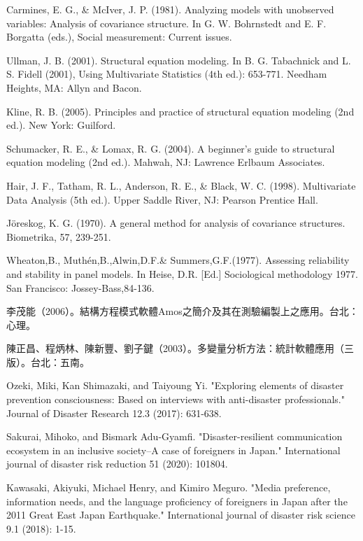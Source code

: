 \documentclass[letterpaper,12pt,titlepage,oneside,final,a4j,dvipdfmx]{book}
\begin{document}
\begin{thebibliography}{60}
 Carmines, E. G., \& McIver, J. P. (1981). Analyzing models with unobserved variables: Analysis of covariance structure. In G. W. Bohrnstedt and E. F. Borgatta (eds.), Social measurement: Current issues.

 Ullman, J. B. (2001). Structural equation modeling. In B. G. Tabachnick and L. S. Fidell (2001), Using Multivariate Statistics (4th ed.): 653-771. Needham Heights, MA: Allyn and Bacon.

 Kline, R. B. (2005). Principles and practice of structural equation modeling (2nd ed.). New York: Guilford.

 Schumacker, R. E., \& Lomax, R. G. (2004). A beginner's guide to structural equation modeling (2nd ed.). Mahwah, NJ: Lawrence Erlbaum Associates.

 Hair, J. F., Tatham, R. L., Anderson, R. E., \& Black, W. C. (1998). Multivariate Data Analysis (5th ed.). Upper Saddle River, NJ: Pearson Prentice Hall.

 Jöreskog, K. G. (1970). A general method for analysis of covariance structures. Biometrika, 57, 239-251.

 Wheaton,B., Muthén,B.,Alwin,D.F.\& Summers,G.F.(1977). Assessing reliability and stability in panel models. In Heise, D.R. [Ed.] Sociological methodology 1977. San Francisco: Jossey-Bass,84-136.

 李茂能（2006）。結構方程模式軟體Amos之簡介及其在測驗編製上之應用。台北：心理。

 陳正昌、程炳林、陳新豐、劉子鍵（2003）。多變量分析方法：統計軟體應用（三版）。台北：五南。

 Ozeki, Miki, Kan Shimazaki, and Taiyoung Yi. "Exploring elements of disaster prevention consciousness: Based on interviews with anti-disaster professionals." Journal of Disaster Research 12.3 (2017): 631-638.

 Sakurai, Mihoko, and Bismark Adu-Gyamfi. "Disaster-resilient communication ecosystem in an inclusive society–A case of foreigners in Japan." International journal of disaster risk reduction 51 (2020): 101804.

 Kawasaki, Akiyuki, Michael Henry, and Kimiro Meguro. "Media preference, information needs, and the language proficiency of foreigners in Japan after the 2011 Great East Japan Earthquake." International journal of disaster risk science 9.1 (2018): 1-15.


\end{thebibliography}
\end{document}
